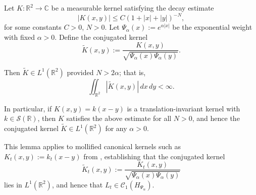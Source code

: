 \begin{lemma}
\label{lem:L1_integrability_conjugated_kernel}
Let \( K \colon \mathbb{R}^2 \to \mathbb{C} \) be a measurable kernel satisfying the decay estimate
\[
|K(x,y)| \le C (1 + |x| + |y|)^{-N},
\]
for some constants \( C > 0 \), \( N > 0 \). Let \( \Psi_\alpha(x) := e^{\alpha |x|} \) be the exponential weight with fixed \( \alpha > 0 \). Define the conjugated kernel
\[
\widetilde{K}(x,y) := \frac{K(x,y)}{\sqrt{\Psi_\alpha(x)\Psi_\alpha(y)}}.
\]

Then \( \widetilde{K} \in L^1(\mathbb{R}^2) \) provided \( N > 2\alpha \); that is,
\[
\iint_{\mathbb{R}^2} |\widetilde{K}(x,y)|\, dx\,dy < \infty.
\]

\medskip
\noindent
In particular, if \( K(x,y) = k(x - y) \) is a translation-invariant kernel with \( k \in \mathcal{S}(\mathbb{R}) \), then \( K \) satisfies the above estimate for all \( N > 0 \), and hence the conjugated kernel \( \widetilde{K} \in L^1(\mathbb{R}^2) \) for any \( \alpha > 0 \).

\medskip
\noindent
This lemma applies to mollified canonical kernels such as \( K_t(x,y) := k_t(x - y) \) from , establishing that the conjugated kernel
\[
\widetilde{K}_t(x,y) := \frac{K_t(x,y)}{\sqrt{\Psi_\alpha(x)\Psi_\alpha(y)}}
\]
lies in \( L^1(\mathbb{R}^2) \), and hence that \( L_t \in \mathcal{C}_1(H_{\Psi_\alpha}) \).
\end{lemma}
